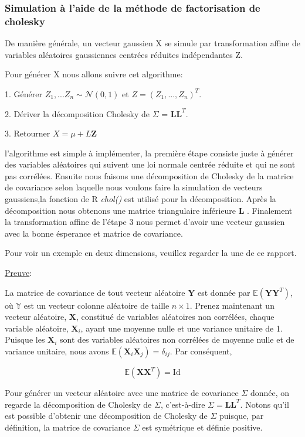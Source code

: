 \documentclass[10pt]{article} %
\begin{document}
 \subsubsection{Simulation à l'aide de la méthode de factorisation de cholesky}

 De manière générale, un vecteur gaussien X se simule par transformation affine de
 variables aléatoires gaussiennes centrées réduites indépendantes Z.

 Pour générer X nous allons suivre cet algorithme:\

 1. Générer $Z_1, ... Z_n \sim \mathcal{N}(0 , 1)$ et $Z = (Z_1,...,Z_n)^T$.

 2. Dériver la décomposition Cholesky de $\Sigma$ = $\textbf{LL}^T$.

 3. Retourner $X = \mu + L\textbf{Z}$


 l'algorithme est simple à implémenter, la première étape consiste juste à générer des variables aléatoires qui suivent une loi normale centrée réduite et qui ne sont pas corrélées. Ensuite nous faisons une décomposition de Cholesky de la matrice de covariance selon laquelle nous voulons faire la simulation de vecteurs gaussiens,la fonction de R {\it chol()} est utilisé pour la décomposition. Après la décomposition nous obtenons une matrice triangulaire inférieure \textbf{L} .
 Finalement la transformation affine de l'étape 3 nous permet d'avoir une vecteur gaussien avec la bonne ésperance et matrice de covariance.

 Pour voir un exemple en deux dimensions, veuillez regarder la une de ce rapport.

 \underline{Preuve}:

 La matrice de covariance de tout vecteur aléatoire $ \textbf{Y} $
 est donnée par $\mathbb{E}(\textbf{YY}^T)$, où $ \mathbb{Y} $ est
 un vecteur colonne aléatoire de taille $n \times 1$. Prenez maintenant un vecteur aléatoire,
 $\textbf{X}$, constitué de variables aléatoires
  non corrélées, chaque variable aléatoire, $\textbf{X}_i$, ayant une moyenne nulle et une variance unitaire de 1. Puisque les $\textbf{X}_i$
  sont des variables aléatoires non corrélées de moyenne nulle et de variance unitaire, nous avons $\mathbb{E}(\textbf{X}_i\textbf{X}_j)= \delta_{ij} $.
  Par conséquent,

$$\mathbb{E}(\textbf{XX}^T) = \text{Id} $$


Pour générer un vecteur aléatoire avec une matrice de covariance $\Sigma$ donnée, on regarde la décomposition de Cholesky de $\Sigma$,
c'est-à-dire $\Sigma =\textbf{LL}^T $. Notons qu'il est possible d'obtenir une décomposition de Cholesky de $\Sigma$ puisque, par définition,
la matrice de covariance $\Sigma $ est symétrique et définie positive.
\end{document}
